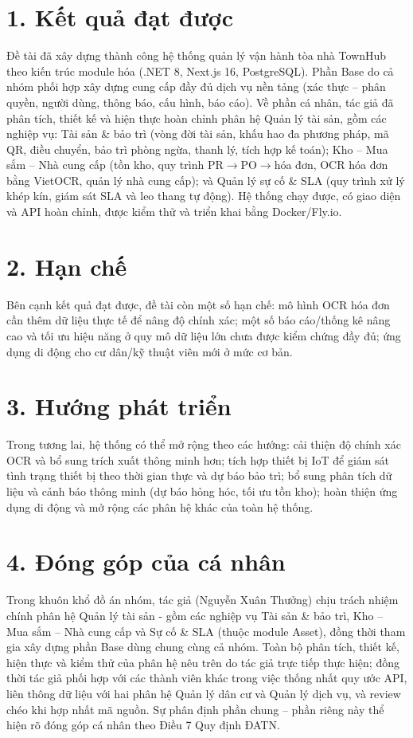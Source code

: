 \section*{1. Kết quả đạt được}
Đề tài đã xây dựng thành công hệ thống quản lý vận hành tòa nhà TownHub theo kiến trúc module hóa (.NET 8, Next.js 16, PostgreSQL). Phần Base do cả nhóm phối hợp xây dựng cung cấp đầy đủ dịch vụ nền tảng (xác thực – phân quyền, người dùng, thông báo, cấu hình, báo cáo). Về phần cá nhân, tác giả đã phân tích, thiết kế và hiện thực hoàn chỉnh phân hệ Quản lý tài sản, gồm các nghiệp vụ: Tài sản \& bảo trì (vòng đời tài sản, khấu hao đa phương pháp, mã QR, điều chuyển, bảo trì phòng ngừa, thanh lý, tích hợp kế toán); Kho – Mua sắm – Nhà cung cấp (tồn kho, quy trình PR$\rightarrow$PO$\rightarrow$hóa đơn, OCR hóa đơn bằng VietOCR, quản lý nhà cung cấp); và Quản lý sự cố \& SLA (quy trình xử lý khép kín, giám sát SLA và leo thang tự động). Hệ thống chạy được, có giao diện và API hoàn chỉnh, được kiểm thử và triển khai bằng Docker/Fly.io.

\section*{2. Hạn chế}
Bên cạnh kết quả đạt được, đề tài còn một số hạn chế: mô hình OCR hóa đơn cần thêm dữ liệu thực tế để nâng độ chính xác; một số báo cáo/thống kê nâng cao và tối ưu hiệu năng ở quy mô dữ liệu lớn chưa được kiểm chứng đầy đủ; ứng dụng di động cho cư dân/kỹ thuật viên mới ở mức cơ bản.

\section*{3. Hướng phát triển}
Trong tương lai, hệ thống có thể mở rộng theo các hướng: cải thiện độ chính xác OCR và bổ sung trích xuất thông minh hơn; tích hợp thiết bị IoT để giám sát tình trạng thiết bị theo thời gian thực và dự báo bảo trì; bổ sung phân tích dữ liệu và cảnh báo thông minh (dự báo hỏng hóc, tối ưu tồn kho); hoàn thiện ứng dụng di động và mở rộng các phân hệ khác của toàn hệ thống.

\section*{4. Đóng góp của cá nhân}
Trong khuôn khổ đồ án nhóm, tác giả (Nguyễn Xuân Thưởng) chịu trách nhiệm chính phân hệ Quản lý tài sản - gồm các nghiệp vụ Tài sản \& bảo trì, Kho – Mua sắm – Nhà cung cấp và Sự cố \& SLA (thuộc module Asset), đồng thời tham gia xây dựng phần Base dùng chung cùng cả nhóm. Toàn bộ phân tích, thiết kế, hiện thực và kiểm thử của phân hệ nêu trên do tác giả trực tiếp thực hiện; đồng thời tác giả phối hợp với các thành viên khác trong việc thống nhất quy ước API, liên thông dữ liệu với hai phân hệ Quản lý dân cư và Quản lý dịch vụ, và review chéo khi hợp nhất mã nguồn. Sự phân định phần chung – phần riêng này thể hiện rõ đóng góp cá nhân theo Điều 7 Quy định ĐATN.

